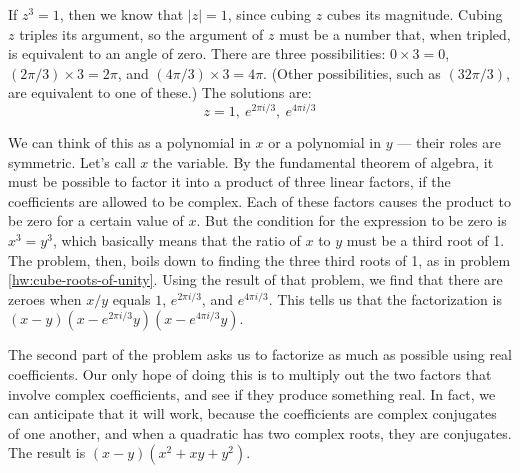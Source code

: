 If $z^3=1$, then we know that $|z|=1$, since cubing $z$ cubes its magnitude. Cubing $z$ triples
its argument, so the argument of $z$ must be a number that, when tripled, is equivalent to an
angle of zero. There are three possibilities: $0\times 3=0$, $(2\pi/3)\times 3=2\pi$,
and $(4\pi/3)\times 3=4\pi$. (Other possibilities, such as $(32\pi/3)$, are equivalent to
one of these.) The solutions are:
\begin{equation*}
z = 1,\ e^{2\pi i/3},\ e^{4\pi i/3}
\end{equation*}

We can think of this as a polynomial in $x$ or a polynomial in $y$ --- their roles are symmetric. Let's call $x$ the variable.
By the fundamental theorem of algebra, it must be possible to factor it into a product of three
linear factors, if the coefficients are allowed to be complex. Each of these factors causes the
product to be zero for a certain value of $x$. But the condition for the expression to be
zero is $x^3=y^3$, which basically means that the ratio of $x$ to $y$ must be a third root of 1.
The problem, then, boils down to finding the three third roots of 1, as in
problem \ref{hw:cube-roots-of-unity}. Using the result of that problem, we find that there
are zeroes when $x/y$ equals $1$, $e^{2\pi i/3}$, and $e^{4\pi i/3}$. This tells us that
the factorization is $(x-y)(x-e^{2\pi i/3}y)(x-e^{4\pi i/3}y)$.

The second part of the problem asks us to factorize as much as possible using real coefficients.
Our only hope of doing this is to multiply out the two factors that involve complex coefficients,
and see if they produce something real. In fact, we can anticipate that it will work, because
the coefficients are complex conjugates of one another, and when a quadratic has two complex
roots, they are conjugates. The result is $(x-y)(x^2+xy+y^2)$.
